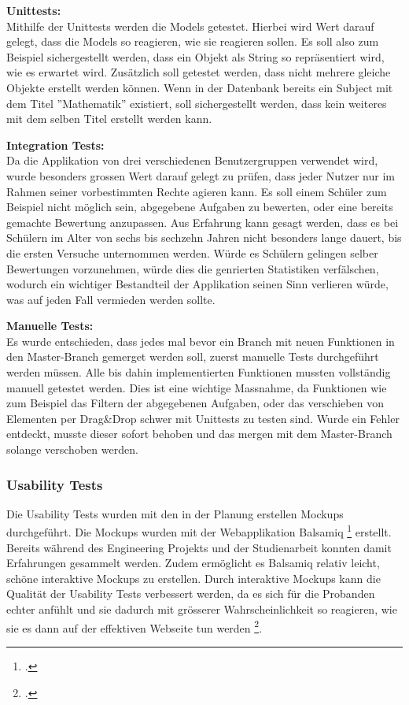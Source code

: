\textbf{Unittests:} \\
Mithilfe der Unittests werden die Models getestet. Hierbei wird Wert darauf gelegt, dass die Models so reagieren, wie sie reagieren sollen. Es soll also zum Beispiel sichergestellt werden, dass ein Objekt als String so repräsentiert wird, wie es erwartet wird. Zusätzlich soll getestet werden, dass nicht mehrere gleiche Objekte erstellt werden können. Wenn in der Datenbank bereits ein Subject mit dem Titel ''Mathematik'' existiert, soll sichergestellt werden, dass kein weiteres mit dem selben Titel erstellt werden kann.

\textbf{Integration Tests:} \\
Da die Applikation von drei verschiedenen Benutzergruppen verwendet wird, wurde besonders grossen Wert darauf gelegt zu prüfen, dass jeder Nutzer nur im Rahmen seiner vorbestimmten Rechte agieren kann. Es soll einem Schüler zum Beispiel nicht möglich sein, abgegebene Aufgaben zu bewerten, oder eine bereits gemachte Bewertung anzupassen. Aus Erfahrung kann gesagt werden, dass es bei Schülern im Alter von sechs bis sechzehn Jahren nicht besonders lange dauert, bis die ersten Versuche unternommen werden. Würde es Schülern gelingen selber Bewertungen vorzunehmen, würde dies die genrierten Statistiken verfälschen, wodurch ein wichtiger Bestandteil der Applikation seinen Sinn verlieren würde, was auf jeden Fall vermieden werden sollte. 

\textbf{Manuelle Tests:} \\
Es wurde entschieden, dass jedes mal bevor ein Branch mit neuen Funktionen in den Master-Branch gemerget werden soll, zuerst manuelle Tests durchgeführt werden müssen. Alle bis dahin implementierten Funktionen mussten vollständig manuell getestet werden. Dies ist eine wichtige Massnahme, da Funktionen wie zum Beispiel das Filtern der abgegebenen Aufgaben, oder das verschieben von Elementen per Drag\&Drop schwer mit Unittests zu testen sind. Wurde ein Fehler entdeckt, musste dieser sofort behoben und das mergen mit dem Master-Branch solange verschoben werden.



\subsubsection{Usability Tests}
Die Usability Tests wurden mit den in der Planung erstellen Mockups durchgeführt. Die Mockups wurden mit der Webapplikation Balsamiq \footcite{balsamiq_mockups} erstellt. Bereits während des Engineering Projekts und der Studienarbeit konnten damit Erfahrungen gesammelt werden. Zudem ermöglicht es Balsamiq relativ leicht, schöne interaktive Mockups zu erstellen. Durch interaktive Mockups kann die Qualität der Usability Tests verbessert werden, da es sich für die Probanden echter anfühlt und sie dadurch mit grösserer Wahrscheinlichkeit so reagieren, wie sie es dann auf der effektiven Webseite tun werden \footcite{interactive_mockups}. \\

